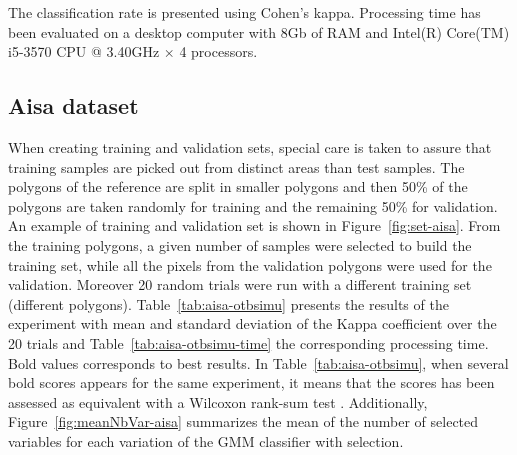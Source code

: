\documentclass[journal]{IEEEtran}
\begin{document}
    The    classification   rate    is    presented   using    Cohen's
    kappa. Processing  time has been  evaluated on a  desktop computer
    with  8Gb of  RAM  and  Intel(R) Core(TM)  i5-3570  CPU @  3.40GHz
    $\times$ 4 processors.

    \subsection{Aisa dataset}
    \label{sec:aisa}

    When creating training and validation  sets, special care is taken
    to assure that training samples are picked out from distinct areas
    than test  samples.  The  polygons of the  reference are  split in
    smaller polygons and then 50\%  of the polygons are taken randomly
    for training and the remaining 50\% for validation.  An example of
    training      and     validation      set     is      shown     in
    Figure~\ref{fig:set-aisa}.  From the  training  polygons, a  given
    number of samples  were selected to build the  training set, while
    all  the pixels  from the  validation polygons  were used  for the
    validation.  Moreover 20  random trials were run  with a different
    training  set (different  polygons).  Table~\ref{tab:aisa-otbsimu}
    presents  the results  of the  experiment with  mean and  standard
    deviation  of  the  Kappa  coefficient  over  the  20  trials  and
    Table~\ref{tab:aisa-otbsimu-time}  the   corresponding  processing
    time. Bold values corresponds to best results. In Table~\ref{tab:aisa-otbsimu}, when several bold scores appears for the same experiment, it means that the scores has been assessed as equivalent with a Wilcoxon rank-sum test \cite{mann1947test}. Additionally, Figure~\ref{fig:meanNbVar-aisa} summarizes the mean of the number of selected variables for each variation of the GMM classifier with selection.
\end{document}
